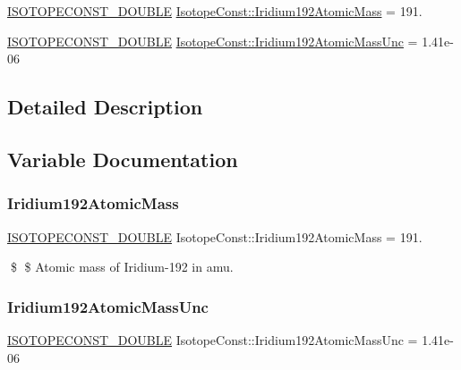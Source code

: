 \begin{DoxyCompactItemize}
\item 
\mbox{\hyperlink{group___isotope_const-_macros_ga8f45a7272ce02c0b4c65c44636ed719a}{I\+S\+O\+T\+O\+P\+E\+C\+O\+N\+S\+T\+\_\+\+D\+O\+U\+B\+LE}} \mbox{\hyperlink{group___isotope_const-_iridium-_ir192_ga6bcc0aeefd43f28d6d032560526532c0}{Isotope\+Const\+::\+Iridium192\+Atomic\+Mass}} = 191.
\item 
\mbox{\hyperlink{group___isotope_const-_macros_ga8f45a7272ce02c0b4c65c44636ed719a}{I\+S\+O\+T\+O\+P\+E\+C\+O\+N\+S\+T\+\_\+\+D\+O\+U\+B\+LE}} \mbox{\hyperlink{group___isotope_const-_iridium-_ir192_ga193dfe7b9cc1bad3e12593283c60608a}{Isotope\+Const\+::\+Iridium192\+Atomic\+Mass\+Unc}} = 1.\+41e-\/06
\end{DoxyCompactItemize}


\subsection{Detailed Description}


\subsection{Variable Documentation}
\mbox{\label{group___isotope_const-_iridium-_ir192_ga6bcc0aeefd43f28d6d032560526532c0}} 
\subsubsection{\texorpdfstring{Iridium192\+Atomic\+Mass}{Iridium192AtomicMass}}
{\footnotesize\ttfamily \mbox{\hyperlink{group___isotope_const-_macros_ga8f45a7272ce02c0b4c65c44636ed719a}{I\+S\+O\+T\+O\+P\+E\+C\+O\+N\+S\+T\+\_\+\+D\+O\+U\+B\+LE}} Isotope\+Const\+::\+Iridium192\+Atomic\+Mass = 191.}

\$ \$ Atomic mass of Iridium-\/192 in amu. \mbox{\label{group___isotope_const-_iridium-_ir192_ga193dfe7b9cc1bad3e12593283c60608a}} 
\subsubsection{\texorpdfstring{Iridium192\+Atomic\+Mass\+Unc}{Iridium192AtomicMassUnc}}
{\footnotesize\ttfamily \mbox{\hyperlink{group___isotope_const-_macros_ga8f45a7272ce02c0b4c65c44636ed719a}{I\+S\+O\+T\+O\+P\+E\+C\+O\+N\+S\+T\+\_\+\+D\+O\+U\+B\+LE}} Isotope\+Const\+::\+Iridium192\+Atomic\+Mass\+Unc = 1.\+41e-\/06}

